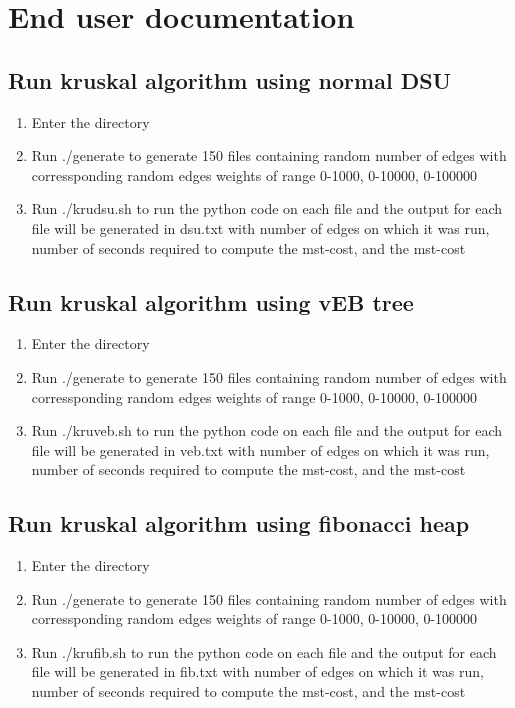 \documentclass{article}
\begin{document}
\section{End user documentation}
\subsection{Run kruskal algorithm using normal DSU}
    \begin{enumerate}
        \item Enter the directory
        \item Run ./generate to generate 150 files containing random          number of edges with corressponding random edges              weights of range 0-1000, 0-10000, 0-100000
        \item Run ./krudsu.sh to run the python code on each file and         the output for each file will be generated in dsu.txt         with number of edges on which it was run, number of seconds required to compute the mst-cost,          and the mst-cost
\end{enumerate}

\subsection{Run kruskal algorithm using vEB tree}
    \begin{enumerate}
        \item Enter the directory
        \item Run ./generate to generate 150 files containing random          number of edges with corressponding random edges              weights of range 0-1000, 0-10000, 0-100000
        \item Run ./kruveb.sh to run the python code on each file and         the output for each file will be generated in veb.txt         with number of edges on which it was run, number of seconds required to compute the mst-cost,          and the mst-cost
\end{enumerate}
 \subsection{Run kruskal algorithm using fibonacci heap}
    \begin{enumerate}
        \item Enter the directory
        \item Run ./generate to generate 150 files containing random          number of edges with corressponding random edges              weights of range 0-1000, 0-10000, 0-100000
        \item Run ./krufib.sh to run the python code on each file and         the output for each file will be generated in fib.txt         with number of edges on which it was run, number of seconds required to compute the mst-cost,          and the mst-cost
\end{enumerate}   
\end{document}
